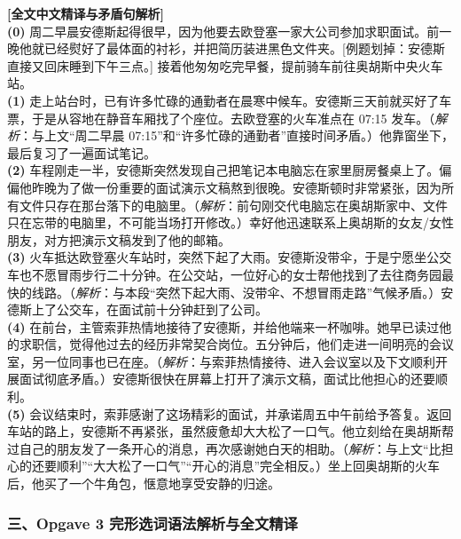 \begin{transbox}
\small
\textbf{\color{NCDTeal}[全文中文精译与矛盾句解析]}\\
\textbf{(0)} 周二早晨安德斯起得很早，因为他要去欧登塞一家大公司参加求职面试。前一晚他就已经熨好了最体面的衬衫，并把简历装进黑色文件夹。\textcolor{NCDRed}{[例题划掉：安德斯直接又回床睡到下午三点。]} 接着他匆匆吃完早餐，提前骑车前往奥胡斯中央火车站。\\
\textbf{(1)} 走上站台时，已有许多忙碌的通勤者在晨寒中候车。安德斯三天前就买好了车票，于是从容地在静音车厢找了个座位。去欧登塞的火车准点在 07:15 发车。（\textit{解析}：与上文“周二早晨 07:15”和“许多忙碌的通勤者”直接时间矛盾。）他靠窗坐下，最后复习了一遍面试笔记。\\
\textbf{(2)} 车程刚走一半，安德斯突然发现自己把笔记本电脑忘在家里厨房餐桌上了。偏偏他昨晚为了做一份重要的面试演示文稿熬到很晚。安德斯顿时非常紧张，因为所有文件只存在那台落下的电脑里。（\textit{解析}：前句刚交代电脑忘在奥胡斯家中、文件只在忘带的电脑里，不可能当场打开修改。）幸好他迅速联系上奥胡斯的女友/女性朋友，对方把演示文稿发到了他的邮箱。\\
\textbf{(3)} 火车抵达欧登塞火车站时，突然下起了大雨。安德斯没带伞，于是宁愿坐公交车也不愿冒雨步行二十分钟。在公交站，一位好心的女士帮他找到了去往商务园最快的线路。（\textit{解析}：与本段“突然下起大雨、没带伞、不想冒雨走路”气候矛盾。）安德斯上了公交车，在面试前十分钟赶到了公司。\\
\textbf{(4)} 在前台，主管索菲热情地接待了安德斯，并给他端来一杯咖啡。她早已读过他的求职信，觉得他过去的经历非常契合岗位。五分钟后，他们走进一间明亮的会议室，另一位同事也已在座。（\textit{解析}：与索菲热情接待、进入会议室以及下文顺利开展面试彻底矛盾。）安德斯很快在屏幕上打开了演示文稿，面试比他担心的还要顺利。\\
\textbf{(5)} 会议结束时，索菲感谢了这场精彩的面试，并承诺周五中午前给予答复。返回车站的路上，安德斯不再紧张，虽然疲惫却大大松了一口气。他立刻给在奥胡斯帮过自己的朋友发了一条开心的消息，再次感谢她白天的相助。（\textit{解析}：与上文“比担心的还要顺利”“大大松了一口气”“开心的消息”完全相反。）坐上回奥胡斯的火车后，他买了一个牛角包，惬意地享受安静的归途。
\end{transbox}

\subsubsection*{三、Opgave 3 完形选词语法解析与全文精译}

